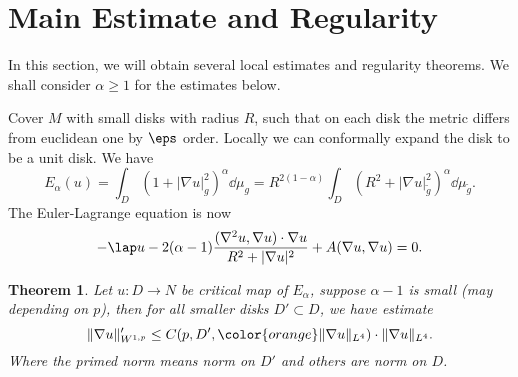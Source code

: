 \documentclass[UTF8,12pt]{article}
\theoremstyle{plain}\newtheorem{theorem}{Theorem}
\theoremstyle{definition}\newtheorem{definition}[theorem]{Definition}
\theoremstyle{definition}\newtheorem{example}[theorem]{Example}
\theoremstyle{plain}\newtheorem{axiom}[theorem]{Axiom}
\theoremstyle{plain}\newtheorem{assertion}[theorem]{Assertion}
\theoremstyle{plain}\newtheorem{corollary}[theorem]{Corollary}
\theoremstyle{plain}\newtheorem{lemma}[theorem]{Lemma}
\theoremstyle{plain}\newtheorem{proposition}[theorem]{Proposition}
\theoremstyle{plain}\newtheorem{prop}[theorem]{Proposition}
\theoremstyle{plain}\newtheorem{conjecture}[theorem]{Conjecture}
\theoremstyle{plain}\newtheorem{conj}[theorem]{Conjecture}
\theoremstyle{plain}\newtheorem{problem}[theorem]{Problem}
\theoremstyle{remark}\newtheorem{notation}[theorem]{Notation}
\theoremstyle{definition}\newtheorem*{question}{Question}
\theoremstyle{definition}\newtheorem*{answer}{Answer}
\theoremstyle{definition}\newtheorem*{goal}{Goal}
\theoremstyle{plain}\newtheorem*{application}{Application}
\theoremstyle{plain}\newtheorem*{exercise}{Exercise}
\theoremstyle{remark}\newtheorem*{remark}{Remark}
\theoremstyle{remark}\newtheorem*{note}{\small{Note}}
\numberwithin{equation}{section}
\numberwithin{theorem}{section}
\numberwithin{figure}{section}
\begin{document}
\section{Main Estimate and Regularity}
In this section, we will obtain several local estimates and regularity theorems.
We shall consider \(\alpha\ge 1\) for the estimates below.

Cover \(M\) with small disks with radius \(R\), such that on each disk the metric
differs from euclidean one by \(\eps\) order. Locally we can conformally expand
the disk to be a unit disk. We have \[
    E_\alpha(u)=\int_D(1+|\nabla u|_{g}^2)^{\alpha}\dd{\mu_g}
    =R^{2(1-\alpha)}\int_D(R^2+|\nabla u|_{\tilde{g}}^2)^{\alpha}\dd{\mu_{\tilde{g}}}
.\] The Euler-Lagrange equation is now
\begin{equation}\label{eq:e-l-disk}
    -\lap u-2(\alpha-1)\frac{(\nabla^2 u,\nabla u)\cdot\nabla u}{R^2+|\nabla u|^2}
    +A(\nabla u,\nabla u)=0
.\end{equation}
\begin{theorem}
    Let \(u\colon D\to N\) be critical map of \(E_\alpha\), suppose \(\alpha-1\) is
    small (may depending on \(p\)), then for all smaller disks \(D'\subset D\),
    we have estimate \[
        \|\nabla u\|_{W^{1,p}}'\le C(p,D',{\color{orange}\|\nabla u\|_{L^4}})
        \cdot \|\nabla u\|_{L^4}
    .\] Where the primed norm means norm on \(D'\) and others are norm on \(D\).
\end{theorem}
\end{document}
